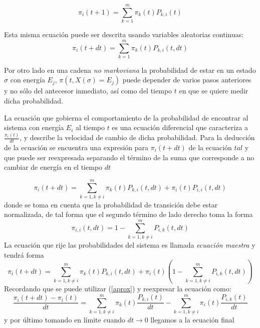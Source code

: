 \documentclass[12pt]{book}
\begin{document}
\begin{equation}
\pi_{i}(t+1) =\sum_{k=1}^{m} \pi_{k}(t)  {P}_{k,i}(t) 
\end{equation}

Esta misma ecuación puede ser descrita usando variables aleatorias continuas:
\begin{equation}
\pi_{i}(t+dt) =\sum_{k=1}^{m}   \pi_{k}(t) {P}_{k,i}(t,dt)
\end{equation}


Por otro lado en una cadena \textit{no markoviana} la probabilidad de estar en un estado $\sigma$ con energía $E_{j}$, $\pi(t,X(\sigma)=E_{j})$ puede depender de varios pasos anteriores y no sólo del antecesor inmediato, así como del tiempo $t$ en que se quiere medir dicha probabilidad.

La ecuación que gobierna el comportamiento de la probabilidad de encontrar al sistema con energía $E_{i}$ al tiempo $t$ es una ecuación diferencial que caracteriza a $\frac{\pi_{i}(t)}{dt}$, y describe la velocidad de cambio de dicha probabilidad. Para la deducción de la ecuación se encuentra una expresión para $\pi_{i}(t+dt)$ de la ecuación $tal$ y que puede ser reexpresada separando el término de la suma que corresponde a no cambiar de energía en el tiempo $dt$

\begin{equation}
\pi_{i}(t+dt) =\sum_{k=1, k\neq i}^{m}  \pi_{k}(t) {P}_{k,i}(t,dt)   + \pi_{i}(t)  {P}_{i,i}(t,dt) 
\end{equation}
donde se toma en cuenta que la probabilidad de transición debe estar normalizada, de tal forma que el segundo término de lado derecho toma la forma
\begin{equation}
\pi_{i,i}(t,dt)= 1-\sum_{k=1, k\neq i}^{m}  {P}_{i,k}(t,dt)
\end{equation}
La ecuación que rije las probabilidades del sistema es llamada \textit{ecuación maestra} y tendrá forma
\begin{equation}
\pi_{i}(t+dt) =\sum_{k=1, k\neq i}^{m}   \pi_{k}(t)  {P}_{k,i}(t,dt) + \pi_{i}(t) \left(1-\sum_{k=1, k\neq i}^{m}  {P}_{i,k}(t,dt)\right)
\end{equation}
Recordando que se puede utilizar (\ref{aprox}) y reexpresar la ecuación como:
\begin{equation}
\frac{\pi_{i}(t+dt)-\pi_{i}(t)}{dt} = \sum_{k=1, k\neq i}^{m}   \pi_{k}(t)  \frac{{P}_{k,i}(t)}{dt} -\sum_{k=1, k\neq i}^{m} \pi_{i}(t)  \frac{{P}_{i,k}(t)}{dt}
\end{equation}
y por último tomando en límite cuando $dt\rightarrow 0$ llegamos a la ecuación final
\end{document}
